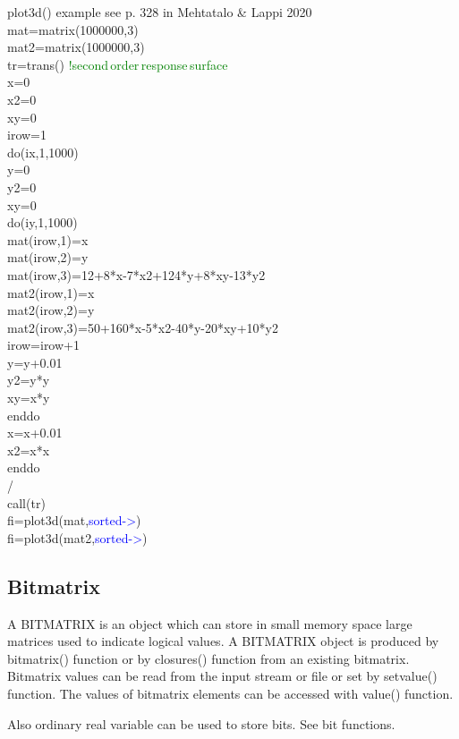 \begin{example}plot3d() example see p.  328 in Mehtatalo & Lappi 2020\\
\label{plot3dex}
mat=\textcolor{VioletRed}{matrix}(1000000,3)\\
mat2=\textcolor{VioletRed}{matrix}(1000000,3)\\
tr=\textcolor{VioletRed}{trans}() \textcolor{green}{!second\,order\,response\,surface}\\
x=0\\
x2=0\\
xy=0\\
irow=1\\
\textcolor{VioletRed}{do}(ix,1,1000)\\
y=0\\
y2=0\\
xy=0\\
\textcolor{VioletRed}{do}(iy,1,1000)\\
mat(irow,1)=x\\
mat(irow,2)=y\\
mat(irow,3)=12+8*x-7*x2+124*y+8*xy-13*y2\\
mat2(irow,1)=x\\
mat2(irow,2)=y\\
mat2(irow,3)=50+160*x-5*x2-40*y-20*xy+10*y2\\
irow=irow+1\\
y=y+0.01\\
y2=y*y\\
xy=x*y\\
enddo\\
x=x+0.01\\
x2=x*x\\
enddo\\
/\\
\textcolor{VioletRed}{call}(tr)\\
fi=\textcolor{VioletRed}{plot3d}(mat,\textcolor{blue}{sorted->})\\
fi=\textcolor{VioletRed}{plot3d}(mat2,\textcolor{blue}{sorted->})
\end{example}
\subsection{Bitmatrix}
\label{bitmatrixo}
A BITMATRIX is an object which can store in small memory space large matrices
used to indicate logical values. A BITMATRIX object is produced by \textcolor{VioletRed}{bitmatrix}()
function or by closures() function from an existing bitmatrix. Bitmatrix values
can be read from the input stream or file or set by setvalue() function. The
values of bitmatrix elements can be accessed with value() function.
\begin{note}
Also ordinary real variable can be used to store bits. See bit functions.
\end{note}
